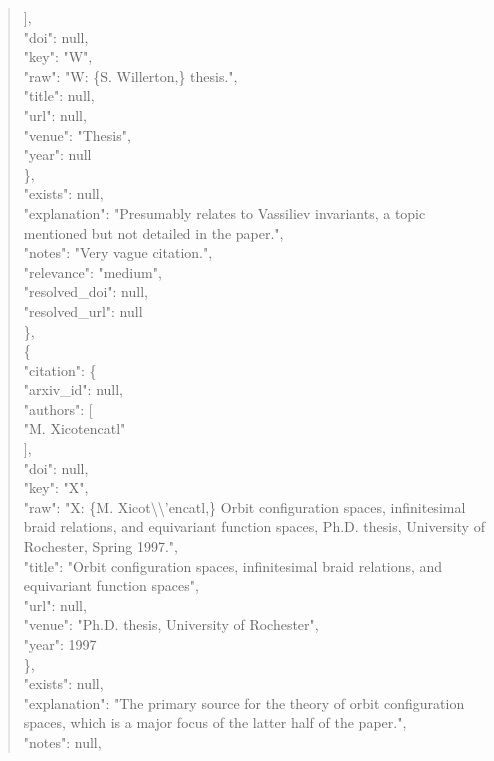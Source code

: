 \documentclass[11pt]{article}
\begin{document}
\begin{quote}
        ],\\
        "doi": null,\\
        "key": "W",\\
        "raw": "W: \{S. Willerton,\} thesis.",\\
        "title": null,\\
        "url": null,\\
        "venue": "Thesis",\\
        "year": null\\
      \},\\
      "exists": null,\\
      "explanation": "Presumably relates to Vassiliev invariants, a topic mentioned but not detailed in the paper.",\\
      "notes": "Very vague citation.",\\
      "relevance": "medium",\\
      "resolved\_doi": null,\\
      "resolved\_url": null\\
    \},\\
    \{\\
      "citation": \{\\
        "arxiv\_id": null,\\
        "authors": [\\
          "M. Xicotencatl"\\
        ],\\
        "doi": null,\\
        "key": "X",\\
        "raw": "X: \{M. Xicot\textbackslash{}\textbackslash{}'encatl,\} Orbit configuration spaces, infinitesimal braid relations, and equivariant function spaces, Ph.D. thesis, University of Rochester, Spring 1997.",\\
        "title": "Orbit configuration spaces, infinitesimal braid relations, and equivariant function spaces",\\
        "url": null,\\
        "venue": "Ph.D. thesis, University of Rochester",\\
        "year": 1997\\
      \},\\
      "exists": null,\\
      "explanation": "The primary source for the theory of orbit configuration spaces, which is a major focus of the latter half of the paper.",\\
      "notes": null,\\

\end{quote}
\end{document}
